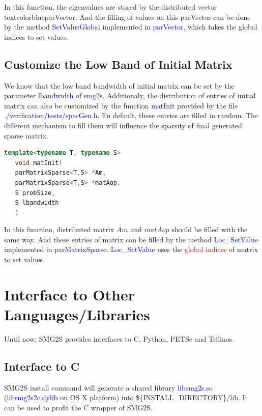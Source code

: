 \documentclass[a4paper, 10 pt]{report}
\begin{document}
In this function, the eigenvalues are stored by the distributed vector textcolor{blue}{parVector}. And the filling of values on this parVector can be done by  the method \textcolor{blue}{SetValueGlobal} implemented in \textcolor{blue}{parVector}, which takes the global indices to set values.

\section{Customize the Low Band of Initial Matrix}
We know that the low band bandwidth of initial matrix can be set by the parameter  \textcolor{blue}{lbandwidth} of \textcolor{blue}{smg2s}. Additionaly, the distribution of entries of initial matrix can also be customized by the function  \textcolor{blue}{matInit} provided by the file \textcolor{blue}{./verification/tests/specGen.h}. En default, these entries are filled in random. The different mechanism to fill them will influence the sparsity of final generated sparse matrix.

	\begin{lstlisting}[language=C++,frame=single]
   template<typename T, typename S>
   void matInit(
   parMatrixSparse<T,S> *Am, 
   parMatrixSparse<T,S> *matAop, 
   S probSize, 
   S lbandwidth
   )
\end{lstlisting}

In this function, distributed matrix $Am$ and $matAop$ should be filled with the same way. And these entries of matrix can be filled by the method \textcolor{blue}{Loc\_SetValue} implemented in \textcolor{blue}{parMatrixSparse}. \textcolor{blue}{Loc\_SetValue} uses the \textcolor{red}{global indices} of matrix to set values.

\newpage
	
	\chapter{Interface to Other Languages/Libraries}
	Until now, SMG2S provides interfaces to C, Python, PETSc and Trilinos.
	
	\section{Interface to C}
	SMG2S install command will generate a shared library \textcolor{blue}{libsmg2s.so} (\textcolor{blue}{libsmg2s2c.dylib} on OS X platform) into \$\{INSTALL\_DIRECTORY\}/lib. It can be used to profit the C wrapper of SMG2S. 
	
\end{document}
